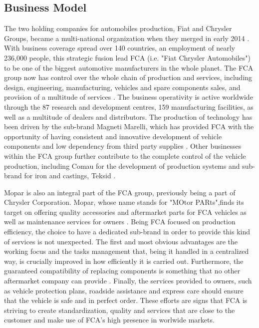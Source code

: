 \subsection{Business Model}
The two holding companies for automobiles production, Fiat and Chrysler Groups, became a multi-national organization when they merged in early 2014 \cite{fca_history}. With business coverage spread over 140 countries, an employment of nearly 236,000 people, this strategic fusion lead FCA (i.e. "Fiat Chrysler Automobiles") to be one of the biggest automotive manufacturers in the whole planet. The FCA group now has control over the whole chain of production and services, including design, engineering, manufacturing, vehicles and spare components sales, and provision of a multitude of services \cite{fca_overview}. The business operativity is active worldwide through the 87 research and development centres, 159 manufacturing facilities, as well as a multitude of dealers and distributors. The production of technology has been driven by the sub-brand Magneti Marelli, which has provided FCA with the opportunity of having consistent and innovative development of vehicle components and low dependency from third party supplies \cite{magneti_marelli}. Other businesses within the FCA group further contribute to the complete control of the vehicle production, including Comau for the development of production systems and sub-brand for iron and castings, Teksid \cite{fca_overview}.\n 

Mopar is also an integral part of the FCA group, previously being a part of Chrysler Corporation. Mopar, whose name stands for "MOtor PARts",finds its target on  offering quality accessories and aftermarket parts for FCA vehicles as well as maintenance services for owners \cite{fca_mopar}. Being FCA focused on production efficiency, the choice to have a dedicated sub-brand in order to provide this kind of services is not unexpected. The first and most obvious advantages are the working focus and the tasks management that, being it handled in a centralized way, is crucially improved in how efficiently it is carried out. Furthermore, the guaranteed compatibility of replacing components is something that no other aftermarket company can provide \cite{fca_mopar}. Finally, the services provided to owners, such as vehicle protection plans, roadside assistance and express care should ensure that the vehicle is safe and in perfect order. These efforts are signs that FCA is striving to create standardization, quality and services that are close to the customer and make use of FCA's high presence in worlwide markets.

